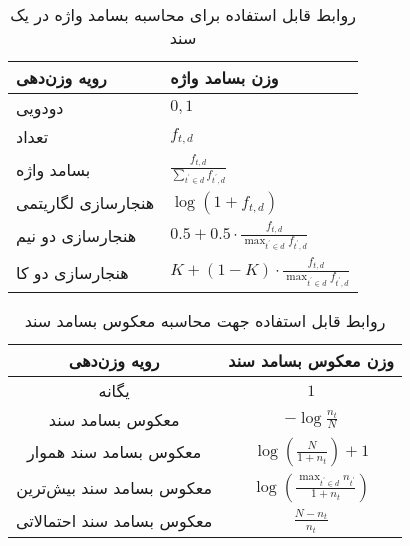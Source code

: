 \begin{table}[h!]
	\caption{روابط قابل استفاده برای محاسبه بسامد واژه در یک سند}
	\label{table.tf}
	\begin{center}
		\begin{tabular}{|M{5cm}|M{5cm}|}
			\hline
			رویه وزن‌دهی\footnotemark & وزن بسامد واژه \\
			\hline
			\hline
						دودویی\footnotemark & 
			$0, 1$ \\ \hline
						تعداد & 
			$f_{t, d}$ \\ \hline
						بسامد واژه & 
			$ \frac{f_{t,d}}{\sum_{t^{'} \in d} f_{t^{'}, d}}$ \\ \hline
						هنجارسازی لگاریتمی\footnotemark & 
			$\log(1 + f_{t, d})$ \\ \hline
						هنجارسازی دو نیم\footnotemark & 
			$0.5 + ‌0.5\cdot \frac{f_{t, d}}{\max_{t^{'} \in d}{f_{t^{'}, d}}} $ \\ \hline
						هنجارسازی دو کا\footnotemark & 
			$K + (1 - K) \cdot \frac{f_{t, d}}{\max_{t^{'} \in d}{f_{t^{'}, d}}} $ \\ \hline
		\end{tabular}
	\end{center}
\end{table}
\begin{table}[h!]
	\caption{روابط قابل استفاده جهت محاسبه معکوس بسامد سند}
	\label{table.idf}
	\begin{center}
		\begin{tabular}{|c|c|}
			\hline
			رویه وزن‌دهی & وزن معکوس بسامد سند \\
			\hline
			\hline
			یگانه & 
			$1$ \\ \hline
			معکوس بسامد سند & 
			$-\log \frac{n_t}{N}$ \\ \hline
			معکوس بسامد سند هموار & 
			$\log(\frac{N}{1 +‌n_t}) + 1$ \\ \hline
			معکوس بسامد سند بیش‌ترین & 
			$\log(\frac{\max_{t^{'} \in d} n_{t^{'}}}{1 +‌n_t})$ \\ \hline
			معکوس بسامد سند احتمالاتی & 
			$\frac{N - n_t}{n_t}$ \\ \hline
		\end{tabular}
	\end{center}
\end{table}

